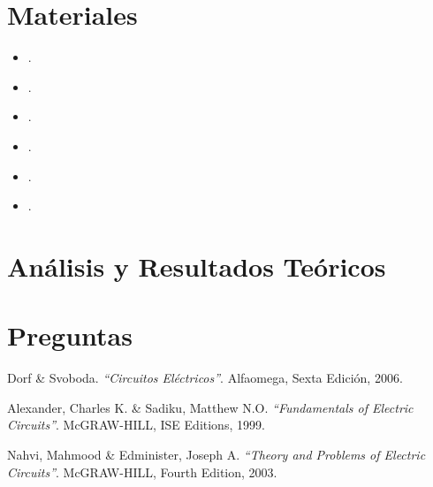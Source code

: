 \documentclass[twocolumn]{IEEEtran}
\begin{document}
\section{Materiales}
\begin{itemize}
 \item .
 \item .
 \item .
 \item .
 \item .
 \item .
\end{itemize}

\section{Análisis y Resultados Teóricos}

\section{Preguntas}


\begin{thebibliography}{99}
 Dorf  \& Svoboda.
{\em "`Circuitos Eléctricos"'}.
Alfaomega, Sexta Edición, 2006.

 Alexander, Charles K. \&  Sadiku, Matthew N.O.
{\em "`Fundamentals of Electric Circuits"'}.
McGRAW-HILL, ISE Editions, 1999.

 Nahvi, Mahmood \& Edminister, Joseph A.
{\em "`Theory and Problems of Electric Circuits"'}.
McGRAW-HILL, Fourth Edition, 2003.
\end{thebibliography}
\end{document}

